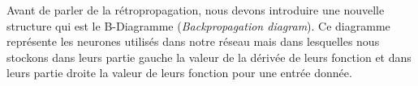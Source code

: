 \documentclass{article}
\begin{document}
Avant de parler de la rétropropagation, nous devons introduire une nouvelle structure qui est le B-Diagramme (\textit{Backpropagation diagram}).
Ce diagramme représente les neurones utilisés dans notre réseau mais dans lesquelles nous stockons dans leurs partie gauche la valeur de la dérivée de leurs fonction et dans leurs partie droite la valeur de leurs fonction pour une entrée donnée.
\newline
\begin{center}
\end{center}
 
\end{document}
